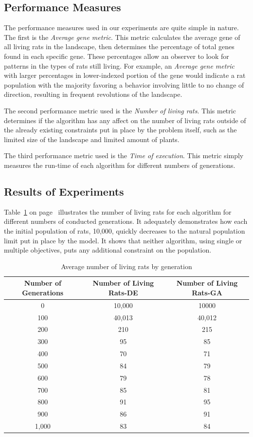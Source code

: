 \documentclass{sig-alternate}
\begin{document}
\subsection{Performance Measures}
\label{sec:perf}
The performance measures used in our experiments are quite simple in nature.  The first is the \emph{Average gene metric}.  This metric calculates the average gene of all living rats in the landscape, then determines the percentage of total genes found in each specific gene.  These percentages allow an observer to look for patterns in the types of rats still living.  For example, an \emph{Average gene metric} with larger percentages in lower-indexed portion of the gene would indicate a rat population with the majority favoring a behavior involving little to no change of direction, resulting in frequent revolutions of the landscape.\cite{LOL}  

The second performance metric used is the \emph{Number of living rats}.  This metric determines if the algorithm has any affect on the number of living rats outside of the already existing constraints put in place by the problem itself, such as the limited size of the landscape and limited amount of plants.  

The third performance metric used is the \emph{Time of execution}.  This metric simply measures the run-time of each algorithm for different numbers of generations.

\subsection{Results of Experiments}
Table~\ref{tab:livingrats} on page~\pageref{tab:livingrats} illustrates the number of living rats for each algorithm for different numbers of conducted generations. It adequately demonstrates how each the initial population of rats, 10,000, quickly decreases to the natural population limit put in place by the model.  It shows that neither algorithm, using single or multiple objectives, puts any additional constraint on the population.

\begin{table}
\centering
\caption{Average number of living rats by generation}
\label{tab:livingrats}
\begin{tabular}{c|c|c}
Number of Generations & Number of Living Rats-DE & Number of Living Rats-GA \\
\hline
0 & 10,000 & 10000\\
100 & 40,013 & 40,012\\
200 & 210 & 215\\
300 & 95 & 85\\
400 & 70 & 71\\
500 & 84 & 79\\
600 & 79 & 78\\
700 & 85 & 81\\
800 & 91 & 95\\
900 & 86 & 91\\
1,000 & 83 & 84
\end{tabular}
\end{table}
\end{document}
